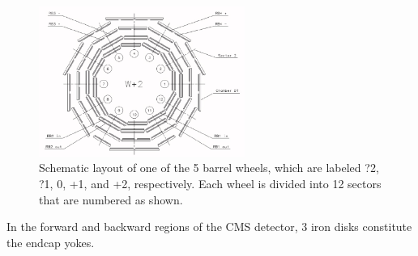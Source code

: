 \begin{figure}[h!]
\centering
\includegraphics[width=0.6\textwidth]{Images/RPC_B}
\caption{Schematic layout of one of the 5 barrel wheels, which are labeled ?2, ?1, 0, +1, and +2, respectively. Each wheel is divided into 12 sectors that are numbered as shown.}
\label{RPC_B}
\end{figure}
In the forward and backward regions of the CMS detector, 3 iron disks constitute the endcap yokes. 

